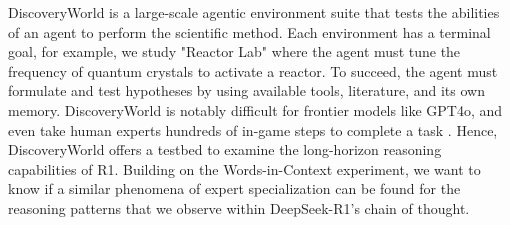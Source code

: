DiscoveryWorld \citep{jansen2024discoveryworld}
is a large-scale agentic environment suite that tests the abilities of an agent to perform the scientific method. Each environment has a terminal goal, for example, we study "Reactor Lab" where the agent must tune the frequency of quantum crystals to activate a reactor. To succeed, the agent must formulate and test hypotheses by using available tools, literature, and its own memory. DiscoveryWorld is notably difficult for frontier models like GPT4o, and even take human experts hundreds of in-game steps to complete a task \citep{jansen2024discoveryworld}. Hence, DiscoveryWorld offers a testbed to examine the long-horizon reasoning capabilities of R1. Building on the Words-in-Context experiment, we want to know if a similar phenomena of expert specialization can be found for the reasoning patterns that we observe within DeepSeek-R1's chain of thought.


